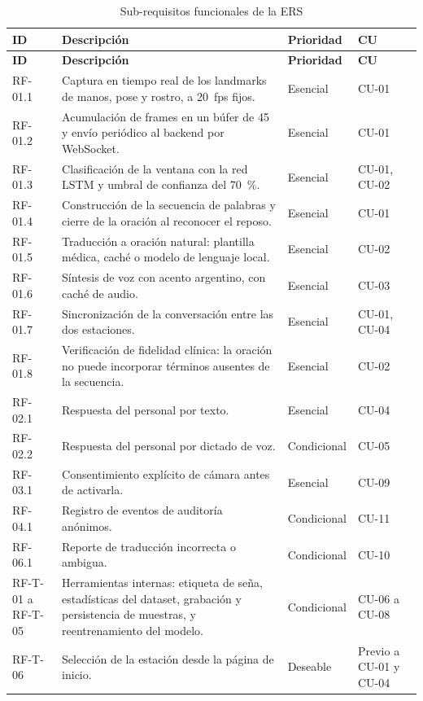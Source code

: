\begin{longtable}{>{\raggedright\arraybackslash}p{2.2cm} >{\raggedright\arraybackslash}p{7.9cm} >{\raggedright\arraybackslash}p{2.2cm} >{\raggedright\arraybackslash}p{2.0cm}}
  \caption{Sub-requisitos funcionales de la ERS}\label{tab:req-sub}\\
  \toprule
  \textbf{ID} & \textbf{Descripción} & \textbf{Prioridad} & \textbf{CU} \\
  \midrule
  \endfirsthead
  \toprule
  \textbf{ID} & \textbf{Descripción} & \textbf{Prioridad} & \textbf{CU} \\
  \midrule
  \endhead
  RF-01.1 & Captura en tiempo real de los landmarks de manos, pose y rostro, a 20~fps fijos. & Esencial & CU-01 \\
  RF-01.2 & Acumulación de frames en un búfer de 45 y envío periódico al backend por WebSocket. & Esencial & CU-01 \\
  RF-01.3 & Clasificación de la ventana con la red LSTM y umbral de confianza del 70~\%. & Esencial & CU-01, CU-02 \\
  RF-01.4 & Construcción de la secuencia de palabras y cierre de la oración al reconocer el reposo. & Esencial & CU-01 \\
  RF-01.5 & Traducción a oración natural: plantilla médica, caché o modelo de lenguaje local. & Esencial & CU-02 \\
  RF-01.6 & Síntesis de voz con acento argentino, con caché de audio. & Esencial & CU-03 \\
  RF-01.7 & Sincronización de la conversación entre las dos estaciones. & Esencial & CU-01, CU-04 \\
  RF-01.8 & Verificación de fidelidad clínica: la oración no puede incorporar términos ausentes de la secuencia. & Esencial & CU-02 \\
  RF-02.1 & Respuesta del personal por texto. & Esencial & CU-04 \\
  RF-02.2 & Respuesta del personal por dictado de voz. & Condicional & CU-05 \\
  RF-03.1 & Consentimiento explícito de cámara antes de activarla. & Esencial & CU-09 \\
  RF-04.1 & Registro de eventos de auditoría anónimos. & Condicional & CU-11 \\
  RF-06.1 & Reporte de traducción incorrecta o ambigua. & Condicional & CU-10 \\
  RF-T-01 a RF-T-05 & Herramientas internas: etiqueta de seña, estadísticas del dataset, grabación y persistencia de muestras, y reentrenamiento del modelo. & Condicional & CU-06 a CU-08 \\
  RF-T-06 & Selección de la estación desde la página de inicio. & Deseable & Previo a CU-01 y CU-04 \\
  \bottomrule
\end{longtable}

